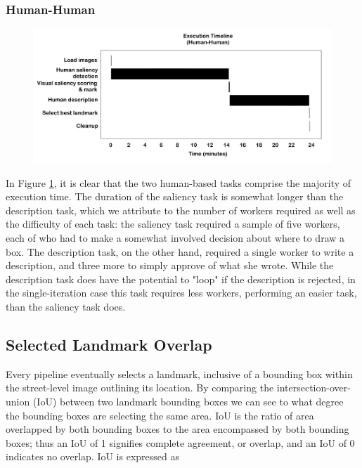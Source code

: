 \subsubsection{Human-Human}
\begin{figure}[htbp]
  \centering
  \includegraphics[width=\textwidth]{images/timeline_hh.pdf}
  \caption{}
  \label{fig:plot:timeline:hh}
\end{figure}

In Figure \ref{fig:plot:timeline:hh}, it is clear that the two human-based tasks comprise the majority of execution time. The duration of the saliency task is somewhat longer than the description task, which we attribute to the number of workers required as well as the difficulty of each task: the saliency task required a sample of five workers, each of who had to make a somewhat involved decision about where to draw a box. The description task, on the other hand, required a single worker to write a description, and three more to simply approve of what she wrote. While the description task does have the potential to "loop" if the description is rejected, in the single-iteration case this task requires less workers, performing an easier task, than the saliency task does.

\subsection{Selected Landmark Overlap}

Every pipeline eventually selects a landmark, inclusive of a bounding box within the street-level image outlining its location. By comparing the intersection-over-union (IoU) between two landmark bounding boxes we can see to what degree the bounding boxes are selecting the same area. IoU is the ratio of area overlapped by both bounding boxes to the area encompassed by both bounding boxes; thus an IoU of 1 signifies complete agreement, or overlap, and an IoU of 0 indicates no overlap. IoU is expressed as

